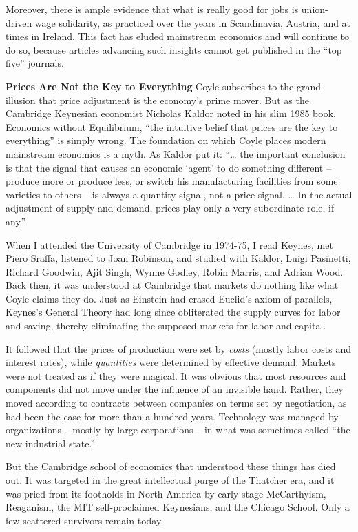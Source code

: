 \documentclass[
]{book}
\begin{document}
Moreover, there is ample evidence that what is really good for jobs is union-driven wage solidarity, as practiced over the years in Scandinavia, Austria, and at times in Ireland. This fact has eluded mainstream economics and will continue to do so, because articles advancing such insights cannot get published in the ``top five'' journals.

\textbf{Prices Are Not the Key to Everything}
Coyle subscribes to the grand illusion that price adjustment is the economy's prime mover. But as the Cambridge Keynesian economist Nicholas Kaldor noted in his slim 1985 book, Economics without Equilibrium, ``the intuitive belief that prices are the key to everything'' is simply wrong. The foundation on which Coyle places modern mainstream economics is a myth. As Kaldor put it: ``\ldots{} the important conclusion is that the signal that causes an economic `agent' to do something different -- produce more or produce less, or switch his manufacturing facilities from some varieties to others -- is always a quantity signal, not a price signal. \ldots{} In the actual adjustment of supply and demand, prices play only a very subordinate role, if any.''

When I attended the University of Cambridge in 1974-75, I read Keynes, met Piero Sraffa, listened to Joan Robinson, and studied with Kaldor, Luigi Pasinetti, Richard Goodwin, Ajit Singh, Wynne Godley, Robin Marris, and Adrian Wood. Back then, it was understood at Cambridge that markets do nothing like what Coyle claims they do. Just as Einstein had erased Euclid's axiom of parallels, Keynes's General Theory had long since obliterated the supply curves for labor and saving, thereby eliminating the supposed markets for labor and capital.

It followed that the prices of production were set by \emph{costs} (mostly labor costs and interest rates), while \emph{quantities} were determined by effective demand. Markets were not treated as if they were magical. It was obvious that most resources and components did not move under the influence of an invisible hand. Rather, they moved according to contracts between companies on terms set by negotiation, as had been the case for more than a hundred years. Technology was managed by organizations -- mostly by large corporations -- in what was sometimes called ``the new industrial state.''

But the Cambridge school of economics that understood these things has died out. It was targeted in the great intellectual purge of the Thatcher era, and it was pried from its footholds in North America by early-stage McCarthyism, Reaganism, the MIT self-proclaimed Keynesians, and the Chicago School. Only a few scattered survivors remain today.
\end{document}
